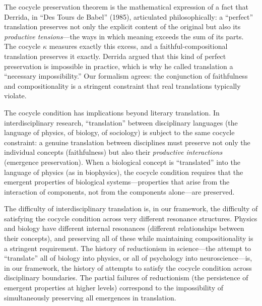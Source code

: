 \begin{interpretation}
\label{int:cocycle-derrida}
The cocycle preservation theorem is the mathematical expression of a fact
that Derrida, in ``Des Tours de Babel'' (1985), articulated philosophically:
a ``perfect'' translation preserves not only the explicit content of the
original but also its \emph{productive tensions}---the ways in which meaning
exceeds the sum of its parts.  The cocycle $\kappa$ measures exactly this
excess, and a faithful-compositional translation preserves it exactly.
Derrida argued that this kind of perfect preservation is impossible in
practice, which is why he called translation a ``necessary impossibility.''
Our formalism agrees: the conjunction of faithfulness and compositionality
is a stringent constraint that real translations typically violate.
\end{interpretation}

\begin{remark}
\label{rem:cocycle-interdisciplinary}
The cocycle condition has implications beyond literary translation.  In interdisciplinary research, ``translation'' between disciplinary languages (the language of physics, of biology, of sociology) is subject to the same cocycle constraint: a genuine translation between disciplines must preserve not only the individual concepts (faithfulness) but also their \emph{productive interactions} (emergence preservation).  When a biological concept is ``translated'' into the language of physics (as in biophysics), the cocycle condition requires that the emergent properties of biological systems---properties that arise from the interaction of components, not from the components alone---are preserved.

The difficulty of interdisciplinary translation is, in our framework, the difficulty of satisfying the cocycle condition across very different resonance structures.  Physics and biology have different internal resonances (different relationships between their concepts), and preserving all of these while maintaining compositionality is a stringent requirement.  The history of reductionism in science---the attempt to ``translate'' all of biology into physics, or all of psychology into neuroscience---is, in our framework, the history of attempts to satisfy the cocycle condition across disciplinary boundaries.  The partial failures of reductionism (the persistence of emergent properties at higher levels) correspond to the impossibility of simultaneously preserving all emergences in translation.
\end{remark}

